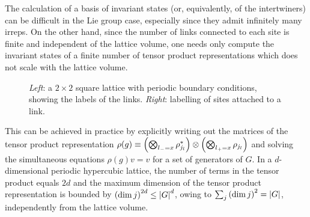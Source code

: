 \medskip

The calculation of a basis of invariant states (or, equivalently, of the intertwiners) can be difficult in the Lie group case, especially since they admit infinitely many irreps.
On the other hand, since the number of links connected to each site is finite and independent of the lattice volume, one needs only compute the invariant states of a finite number of tensor product representations which does not scale with the lattice volume.

\begin{figure}[t]
    \centering
    \caption{\emph{Left}: a $2\times 2$ square lattice with periodic boundary conditions, showing the labels of the links.
        \emph{Right}: labelling of sites attached to a link.}
    \label{fig:periodic plaquette}
\end{figure}

This can be achieved in practice by explicitly writing out the matrices of the tensor product representation $\rho(g) \equiv \pqty{\bigotimes_{l_-=x} \rho_{j_l}^*} \otimes \pqty{\bigotimes_{l_+=x} \rho_{j_l} }$ and solving the simultaneous equations $\rho(g) v = v$ for a set of generators of $G$.
In a $d$-dimensional periodic hypercubic lattice, the number of terms in the tensor product equals $2d$ and the maximum dimension of the tensor product representation is bounded by $\pqty{\dim{j}}^{2d} \leq \abs{G}^d$, owing to $\sum_j \pqty{\dim{j}}^2 = \abs{G}$, independently from the lattice volume.

